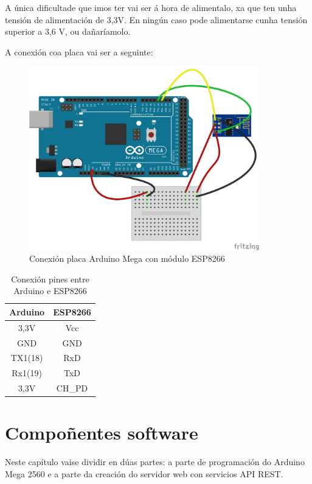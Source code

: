 \documentclass[11pt,twoside]{book}
\begin{document}
A única dificultade que imos ter vai ser á hora de alimentalo, xa que ten unha tensión de alimentación de 3,3V. En ningún caso pode alimentarse cunha tensión superior a 3,6 V, ou dañaríamolo.

A conexión coa placa vai ser a seguinte:

\begin{figure}[H]
	\begin{center}
		\includegraphics[width=10cm]{images/conexionArduinoESP8266_WiFiEsp.png}
	\end{center}
	\caption{Conexión placa Arduino Mega con módulo ESP8266}
	\label{fig:ConexionESP8266}
\end{figure}

\begin{table}[htbt]
\begin{center}
\begin{tabular}{|c|c|}
\hline
Arduino & ESP8266 \\
\hline
3,3V & Vcc \\
\hline
GND & GND \\
\hline
TX1(18) & RxD \\
\hline
Rx1(19) & TxD \\
\hline
3,3V & CH\_PD \\
\hline
\end{tabular}
\caption{Conexión pines entre Arduino e ESP8266}
\label{TablaArduinoESP8266_WiFiEsp}
\end{center}
\end{table}

\chapter{Compoñentes software}

Neste capítulo vaise dividir en dúas partes: a parte de programación do Arduino Mega 2560 e a parte da creación do servidor web con servicios API REST.
\end{document}
